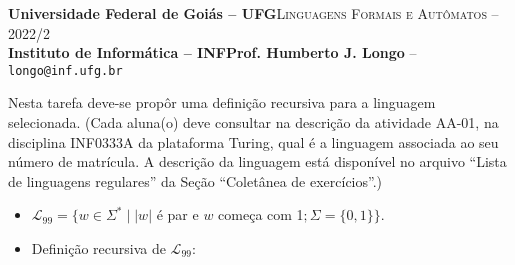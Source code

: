\documentclass[12pt]{article}
\def\discente{Fulana(o) de tal}
\def\matricula{20010101}
\def\ua{01}
\def\myling{{99}} %
\begin{document}
 \begin{tcolorbox}[rounded corners, colback=blue!3, colframe=blue!40!black]
  \footnotesize\textbf{Universidade Federal de Goiás -- UFG}\hfill \textsc{Linguagens Formais e Autômatos -- 2022/2}\\
  \footnotesize\textbf{Instituto de Informática -- INF\hfill Prof. Humberto J. Longo} -- \scriptsize\texttt{longo@inf.ufg.br}
 \end{tcolorbox}\bigskip
%
\begin{tcolorbox}[rounded corners, colback=blue!2, colframe=blue!40!black, title=\textbf{Atividade AA-\ua}]
  Nesta tarefa deve-se propôr uma definição recursiva para a linguagem selecionada. (Cada aluna(o) deve consultar na descrição da atividade AA-\ua, na disciplina INF0333A da plataforma Turing, qual é a linguagem associada ao seu número de matrícula. A descrição da linguagem está disponível no arquivo ``Lista de linguagens regulares'' da Seção ``Coletânea de exercícios''.)
\end{tcolorbox}\bigskip
%
\begin{tcolorbox}[rounded corners, colback=yellow!5, colframe=red!40!black, title=\textbf{\matricula\ -- \discente}]
 \begin{itemize}[leftmargin=*]
% 
  \item $\mathcal{L}_\myling = \{w\in\Sigma^*\mid |w|$ é par e $w$ começa com 1$; \Sigma=\{0,1\}\}$.
%
  \item  Definição recursiva de $\mathcal{L}_\myling$:
%
% 
 \end{itemize}
\end{tcolorbox}
%
\end{document}
